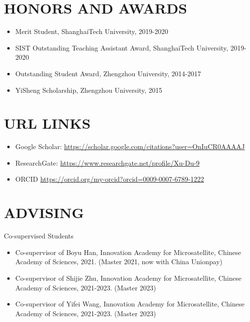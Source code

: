 \documentclass[paper=a4,fontsize=11pt]{scrartcl} %
\newcommand{\sepspace}{\vspace*{1em}}		%
\newcommand{\NewPart}[1]{\section*{\uppercase{#1}}}
\newcommand{\EducationEntry}[4]{
	\noindent \textbf{#1} \hfill      %
	\colorbox{White}{%
		\parbox{5cm}{%
			\hfill\color{Black}#2}} \par  %
	\noindent \textit{#3} \par        %
	\noindent\hangindent=2em\hangafter=0 \small #4 %
	\normalsize \par}
\begin{document}
			
			\NewPart{HONORS AND AWARDS}
			\begin{itemize}
				\item Merit Student, ShanghaiTech University, 2019-2020
				
				\item SIST Outstanding Teaching Assistant Award, ShanghaiTech University, 2019-2020
				
				
				\item Outstanding Student Award, Zhengzhou University, 2014-2017
				
				\item YiSheng Scholarship, Zhengzhou University, 2015
				
				
			\end{itemize}
			\NewPart{URL Links}
			\begin{itemize}
				\item Google Scholar: \url{https://scholar.google.com/citations?user=OnIuCR0AAAAJ}
				\item ResearchGate: \url{https://www.researchgate.net/profile/Xu-Du-9}
				\item ORCID \url{https://orcid.org/my-orcid?orcid=0009-0007-6789-1222}
			\end{itemize}
			\NewPart{Advising}{Co-supervised Students}
			\begin{itemize}
				\item Co-supervisor of Boyu Han, Innovation Academy for Microsatellite, Chinese Academy of Sciences, 2021.
				(Master 2021, now with China Unionpay)
				\item Co-supervisor of Shijie Zhu, Innovation Academy for Microsatellite, Chinese Academy of Sciences, 2021-2023.
				(Master 2023)
				\item Co-supervisor of Yifei Wang, Innovation Academy for Microsatellite, Chinese Academy of Sciences, 2021-2023.
				(Master 2023)
			\end{itemize}
			
\end{document}
